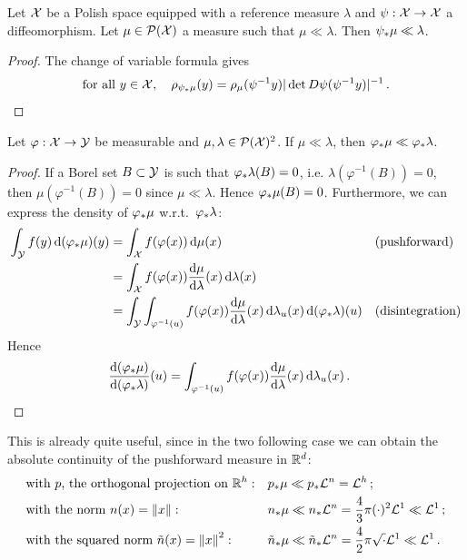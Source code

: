     \begin{proposition}
        \label{prop:density-diffeo}
        Let $\mathcal{X}$ be a Polish space equipped with a reference measure $\lambda$ and $\psi:\mathcal{X}\to\mathcal{X}$ a diffeomorphism. Let $\mu \in \mathcal{P}(\mathcal{X})$ a measure such that $\mu\ll\lambda$. Then $\psi_*\mu\ll\lambda$.
    \end{proposition}
    \begin{proof}
        The change of variable formula gives
        \begin{equation*}
            \text{for all }y\in\mathcal{X},\quad \rho_{\psi_*\mu}(y)=\rho_{\mu}(\psi ^{-1}y)|\det D\psi(\psi ^{-1}y)|^{-1}\,.\qedhere
        \end{equation*}
    \end{proof}


    \begin{proposition}
        \label{prop:density-general}
        Let $\varphi: \mathcal{X}\to \mathcal{Y}$ be measurable and $\mu,\lambda \in\mathcal{P}(\mathcal{X})^2$. If $\mu \ll \lambda$, then $\varphi_*\mu\ll \varphi_*\lambda$.
    \end{proposition}
    \begin{proof}
        If a Borel set $B\subset \mathcal{Y}$ is such that $\varphi_*\lambda(B)=0$, i.e. $\lambda(\varphi^{-1}(B))=0$, then $\mu(\varphi^{-1}(B))=0$ since $\mu\ll \lambda$. Hence $\varphi_*\mu(B)=0$. Furthermore, we can express the density of $\varphi_*\mu$ w.r.t.~$\varphi_*\lambda$:
        \begin{align*}
        \int _{\mathcal{Y}}f(y)\, \mathrm d(\varphi_*\mu)(y) & =\int_{\mathcal{X}}f(\varphi(x))\, \mathrm d\mu(x) &  & \text{(pushforward)} \\
            & =\int _{\mathcal{X}}f(\varphi(x)) \frac{\mathrm d\mu}{\mathrm d\lambda}(x)\, \mathrm d\lambda(x) \\
            & =\int _{\mathcal{Y}}\int _{\varphi^{-1}(u)}f(\varphi(x))\frac{\mathrm d\mu}{\mathrm d\lambda}(x)\, \mathrm d\lambda_{u}(x)\, \mathrm d(\varphi_*\lambda)(u) &  & \text{(disintegration)}
        \end{align*}
        Hence
        \begin{align*}
        \frac{\mathrm d(\varphi_*\mu)}{\mathrm d(\varphi_*\lambda)}(u)&=\int _{\varphi^{-1}(u)}f(\varphi(x))\frac{\mathrm d\mu}{\mathrm d\lambda}(x)\, \mathrm d\lambda_{u}(x)\,. \qedhere
        \end{align*}
        \end{proof}
    This is already quite useful, since in the two following case we can obtain the absolute continuity of the pushforward measure in $\mathbb{R}^d$:
    \begin{align*}
        &\text{with } p \text{, the orthogonal projection on } \mathbb{R}^h: && p_*\mu\ll p_*\mathcal{L}^n=\mathcal{L}^h\,;\\
        &\text{with the norm } n(x)=\left\|x\right\|: && n_*\mu\ll n_*\mathcal{L}^n=\frac43 \pi (\cdot)^2 \mathcal{L}^1\ll \mathcal{L}^1\,;\\
        &\text{with the squared norm } \tilde{n}(x)=\left\|x\right\|^2: && \tilde{n}_*\mu\ll \tilde{n}_*\mathcal{L}^n=\frac42 \pi \sqrt{\cdot} \mathcal{L}^1\ll \mathcal{L}^1\,.
    \end{align*}


